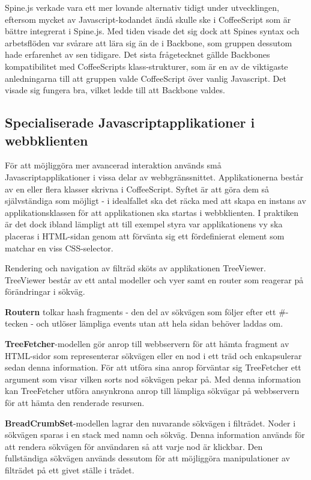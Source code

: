 Spine.js verkade vara ett mer lovande alternativ tidigt under utvecklingen, eftersom mycket av Javascript-kodandet ändå skulle ske i CoffeeScript som är bättre integrerat i Spine.js. Med tiden visade det sig dock att Spines syntax och arbetsflöden var svårare att lära sig än de i Backbone, som gruppen dessutom hade erfarenhet av sen tidigare. Det sista frågetecknet gällde Backbones kompatibilitet med CoffeeScripts klass-strukturer, som är en av de viktigaste anledningarna till att gruppen valde CoffeeScript över vanlig Javascript. Det visade sig fungera bra, vilket ledde till att Backbone valdes.

\subsection{Specialiserade Javascriptapplikationer i webbklienten}
För att möjliggöra mer avancerad interaktion används små Javascriptapplikationer i vissa delar av webbgränssnittet. Applikationerna består av en eller flera klasser skrivna i CoffeeScript. Syftet är att göra dem så självständiga som möjligt - i idealfallet ska det räcka med att skapa en instans av applikationsklassen för att applikationen ska startas i webbklienten. I praktiken är det dock ibland lämpligt att till exempel styra var applikationens vy ska placeras i HTML-sidan genom att förvänta sig ett fördefinierat element som matchar en viss CSS-selector.

Rendering och navigation av filträd sköts av applikationen TreeViewer. TreeViewer består av ett antal modeller och vyer samt en router som reagerar på förändringar i sökväg. 

{\bf Routern} tolkar hash fragments - den del av sökvägen som följer efter ett \#-tecken - och utlöser lämpliga events utan att hela sidan behöver laddas om.

{\bf TreeFetcher}-modellen gör anrop till webbservern för att hämta fragment av HTML-sidor som representerar sökvägen eller en nod i ett träd och enkapsulerar sedan denna information. För att utföra sina anrop förväntar sig TreeFetcher ett argument som visar vilken sorts nod sökvägen pekar på. Med denna information kan TreeFetcher utföra ansynkrona anrop till lämpliga sökvägar på webbservern för att hämta den renderade resursen.

{\bf BreadCrumbSet}-modellen lagrar den nuvarande sökvägen i filträdet. Noder i sökvägen sparas i en stack med namn och sökväg. Denna information används för att rendera sökvägen för användaren så att varje nod är klickbar. Den fullständiga sökvägen används dessutom för att möjliggöra manipulationer av filträdet på ett givet ställe i trädet.

